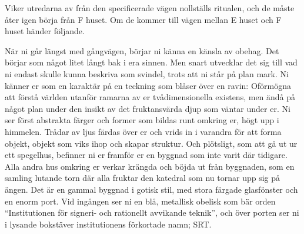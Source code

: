 %
Viker utredarna av från den specificerade vägen nollställs ritualen, och de måste åter igen börja från F huset. Om de kommer till vägen mellan E huset och F huset händer följande.
%
\begin{displayquote}
	När ni går längst med gångvägen, börjar ni känna en känsla av obehag. Det börjar som något litet långt bak i era sinnen. Men snart utvecklar det sig till vad ni endast skulle kunna beskriva som svindel, trots att ni står på plan mark. Ni känner er som en karaktär på en teckning som blåser över en ravin: Oförmögna att förstå världen utanför ramarna av er tvådimensionella existens, men ändå på något plan under den insikt av det fruktansvärda djup som väntar under er. Ni ser först abstrakta färger och former som bildas runt omkring er, högt upp i himmelen. Trådar av ljus färdas över er och vrids in i varandra för att forma objekt, objekt som viks ihop och skapar struktur. Och plötsligt, som att gå ut ur ett spegelhus, befinner ni er framför er en byggnad som inte varit där tidigare. Alla andra hus omkring er verkar krängda och böjda ut från byggnaden, som en samling lutande torn där alla fruktar den katedral som nu tornar upp sig på ängen. Det är en gammal byggnad i gotisk stil, med stora färgade glasfönster och en enorm port. Vid ingången ser ni en blå, metallisk obelisk som bär orden ``Institutionen för signeri- och rationellt avvikande teknik'', och över porten ser ni i lysande bokstäver institutionens förkortade namn; SRT.
\end{displayquote}
